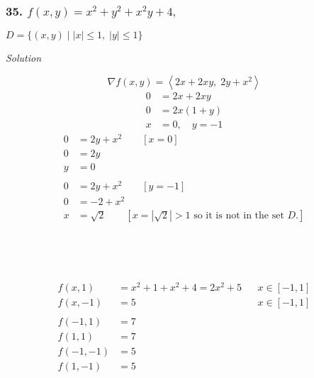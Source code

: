\documentclass{article}
\newcommand\vv[1]{\left\langle #1 \right\rangle}
\newcommand{\such}{\; | \;}
\newcommand{\solution}{\centerline{\textit{Solution}}}
\newcommand{\also}{,\quad}
\begin{document}
{{{{{\subsubsection*{35. $f(x,y)=x^2+y^2+x^2y+4,$} 
$D = \{(x,y)\such |x| \leq 1,\; |y| \leq 1\}$ \\
\solution
\[
    \nabla f(x,y) = \vv{2x+2xy,\; 2y+x^2}
\]
\begin{align*}
    0 &= 2x + 2xy \\
    0 &= 2x(1 + y) \\
    x &= 0 \also y = -1
\end{align*}
\begin{align*}
    0 &= 2y + x^2 \qquad [x=0] \\
    0 &= 2y \\
    y &= 0 \\\\
    0 &= 2y + x^2 \qquad [y=-1] \\
    0 &= -2 + x^2 \\
    x &= \sqrt 2 \qquad [\text{$x = |\sqrt 2| > 1$ so it is not in the set $D$.}]
\end{align*}
 \\\\
 \\\\
\begin{align*}
    f(x,1) &= x^2 + 1 + x^2 + 4 = 2x^2 + 5 & &x\in[-1,1] \\
    f(x,-1) &= 5 & &x\in[-1,1]\\\\
    f(-1, 1) &= 7 \\
    f(1, 1) &= 7 \\
    f(-1, -1) &= 5 \\
    f(1, -1) &= 5 \\
\end{align*}
}}}}}
\end{document}
